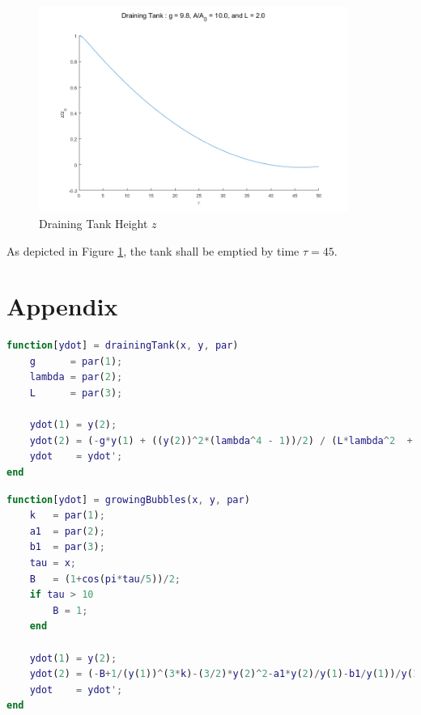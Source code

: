 \documentclass{article}
\begin{document}
\begin{figure}[h!]
	\centering
	\includegraphics[width=0.90\textwidth]{./matlab/drainingTank_Height.png}
	\caption{Draining Tank Height $z$}
	\label{img:drainingTankHeight}
\end{figure}

As depicted in Figure \ref{img:drainingTankHeight}, the tank shall be emptied by time $\tau = 45$.


\pagebreak 
\section*{Appendix}

\begin{lstlisting}[language=Matlab, caption=drainingTank]
function[ydot] = drainingTank(x, y, par)
    g      = par(1);
    lambda = par(2);
    L      = par(3);
    
    ydot(1) = y(2);
    ydot(2) = (-g*y(1) + ((y(2))^2*(lambda^4 - 1))/2) / (L*lambda^2  + y(1));
    ydot    = ydot';
end
\end{lstlisting}

\begin{lstlisting}[language=Matlab, caption=growingBubbles]
function[ydot] = growingBubbles(x, y, par)
    k   = par(1);
    a1  = par(2);
    b1  = par(3);
    tau = x;
    B   = (1+cos(pi*tau/5))/2;
    if tau > 10
        B = 1;
    end
    
    ydot(1) = y(2);
    ydot(2) = (-B+1/(y(1))^(3*k)-(3/2)*y(2)^2-a1*y(2)/y(1)-b1/y(1))/y(1);
    ydot    = ydot';
end
\end{lstlisting}
\end{document}
